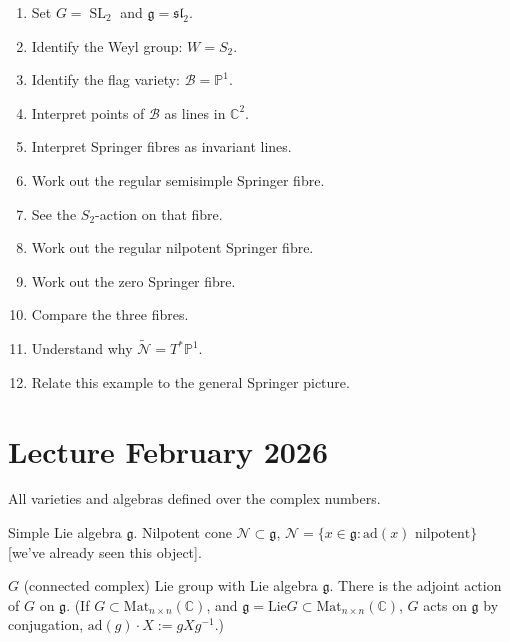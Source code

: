 \begin{enumerate}
\item Set
$G=\operatorname{SL}_2$ and
$\mathfrak g=\mathfrak{sl}_2$.

\item Identify the Weyl group:
$W=S_2$.

\item Identify the flag variety:
$\mathcal B=\mathbb P^1$.

\item Interpret points of $\mathcal B$
as lines in $\mathbb C^2$.

\item Interpret Springer fibres
as invariant lines.

\item Work out the regular semisimple
Springer fibre.

\item See the $S_2$-action on that fibre.

\item Work out the regular nilpotent
Springer fibre.

\item Work out the zero Springer fibre.

\item Compare the three fibres.

\item Understand why
$\widetilde{\mathcal N}=T^*\mathbb P^1$.

\item Relate this example to the general
Springer picture.
\end{enumerate}


\label{section-phantom}

\section{Lecture February 2026}
\label{section-lecture-feb}

\noindent
All varieties and algebras defined over the
complex numbers.

\medskip\noindent
Simple Lie algebra $\mathfrak{g}$. Nilpotent
cone $\mathcal{N} \subset
\mathfrak{g}$,
$\mathcal{N}=\{ x \in \mathfrak{g}:
\text{ad}(x)\text{ nilpotent}\}$
[we've already seen this object].

$G$ (connected complex) Lie group with Lie
algebra $\mathfrak{g}$. There is the adjoint
action of $G$ on $\mathfrak{g}$. (If $G
\subset \text{Mat}_{n\times n}(\mathbb{C})$,
and $\mathfrak{g}= \text{Lie} G\subset
\text{Mat}_{n \times n}(\mathbb{C})$,
$G$ acts on $\mathfrak{g}$ by conjugation,
$\text{ad}(g)\cdot X:=g X g^{-1}$.)

